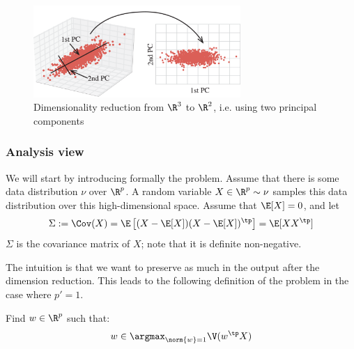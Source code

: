 \documentclass[toc, titlepaged]{../cs-classes/cs-classes}
\begin{document}
\begin{figure}[H]
    \centering
    \includegraphics[width=0.7\textwidth]{images/dimensionality-reduction.png}
    \caption{Dimensionality reduction from $\R^3$ to $\R^2$, i.e. using two principal components}
\end{figure}

\subsubsection{Analysis view}
We will start by introducing formally the problem. Assume that there is some data distribution $\nu$ over $\R^p$. A random variable $X\in\R^p\sim\nu$ samples this data distribution over this high-dimensional space. Assume that $\E[X]=0$, and let
\begin{equation*}
    \Sigma:=\Cov(X)=\E\left[(X-\E[X])(X-\E[X])^\tp\right]=\E[XX^\tp]
\end{equation*}
$\Sigma$ is the covariance matrix of $X$; note that it is definite non-negative.

The intuition is that we want to preserve as much  in the output after the dimension reduction. This leads to the following definition of the problem in the case where $p'=1$.
\begin{definition}
    Find $w\in\R^{p}$ such that:
    \begin{equation}
        \label{eq:pca-problem}
        w\in\argmax_{\norm{w}=1}\V(w^\tp X)
    \end{equation}
\end{definition}
\end{document}

